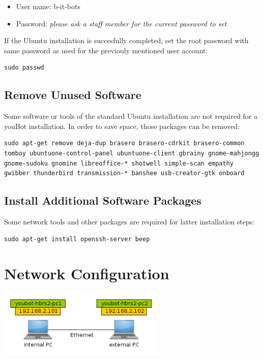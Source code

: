 \documentclass[a4paper,12pt]{article}
\begin{document}
\begin{itemize}
	\item User name: b-it-bots
	\item Password: \textit{please ask a staff member for the current password to set}
\end{itemize}

If the Ubuntu installation is succesfully completed, set the root password with same password as used for the previouly mentioned user account:
\begin{lstlisting}
sudo passwd
\end{lstlisting}

\subsection{Remove Unused Software}
Some software or tools of the standard Ubuntu installation are not required for a youBot installation. In order to save space, those packages can be removed:
\begin{lstlisting}
sudo apt-get remove deja-dup brasero brasero-cdrkit brasero-common tomboy ubuntuone-control-panel ubuntuone-client gbrainy gnome-mahjongg gnome-sudoku gnomine libreoffice-* shotwell simple-scan empathy gwibber thunderbird transmission-* banshee usb-creator-gtk onboard
\end{lstlisting}

\subsection{Install Additional Software Packages}
Some network tools and other packages are required for latter installation steps:
\begin{lstlisting}
sudo apt-get install openssh-server beep
\end{lstlisting}





\section{Network Configuration}
\begin{center}
	\includegraphics[width=0.60\textwidth]{gfx/network.png}
\end{center}
\end{document}

